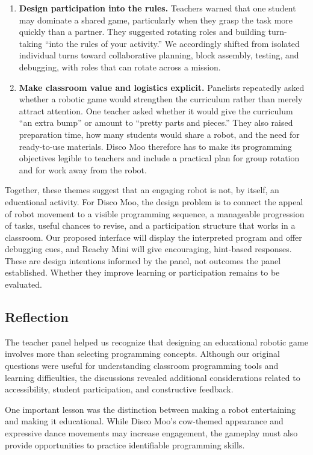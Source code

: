\documentclass[conference]{IEEEtran}
\begin{document}
\begin{enumerate}
    \item \textbf{Design participation into the rules.} Teachers warned that one student may dominate a shared game, particularly when they grasp the task more quickly than a partner. They suggested rotating roles and building turn-taking ``into the rules of your activity.'' We accordingly shifted from isolated individual turns toward collaborative planning, block assembly, testing, and debugging, with roles that can rotate across a mission.

    \item \textbf{Make classroom value and logistics explicit.} Panelists repeatedly asked whether a robotic game would strengthen the curriculum rather than merely attract attention. One teacher asked whether it would give the curriculum ``an extra bump'' or amount to ``pretty parts and pieces.'' They also raised preparation time, how many students would share a robot, and the need for ready-to-use materials. Disco Moo therefore has to make its programming objectives legible to teachers and include a practical plan for group rotation and for work away from the robot.
\end{enumerate}

Together, these themes suggest that an engaging robot is not, by itself, an educational activity. For Disco Moo, the design problem is to connect the appeal of robot movement to a visible programming sequence, a manageable progression of tasks, useful chances to revise, and a participation structure that works in a classroom. Our proposed interface will display the interpreted program and offer debugging cues, and Reachy Mini will give encouraging, hint-based responses. These are design intentions informed by the panel, not outcomes the panel established. Whether they improve learning or participation remains to be evaluated.

\subsection{Reflection}

The teacher panel helped us recognize that designing an educational robotic game involves more than selecting programming concepts. Although our original questions were useful for understanding classroom programming tools and learning difficulties, the discussions revealed additional considerations related to accessibility, student participation, and constructive feedback.

One important lesson was the distinction between making a robot entertaining and making it educational. While Disco Moo's cow-themed appearance and expressive dance movements may increase engagement, the gameplay must also provide opportunities to practice identifiable programming skills.
\end{document}
